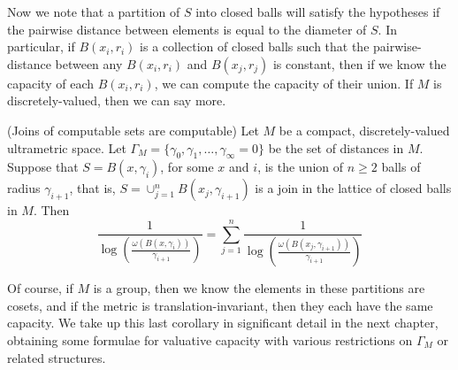 Now we note that a partition of $S$ into closed balls will satisfy the hypotheses if the pairwise distance between elements is equal to the diameter of $S$. In particular, if $B(x_i,r_i)$ is a collection of closed balls such that the pairwise-distance between any $B(x_i,r_i)$ and $B(x_j,r_j)$ is constant, then if we know the capacity of each $B(x_i,r_i)$, we can compute the capacity of their union. If $M$ is discretely-valued, then we can say more.\\ 
\begin{corollary}
	(Joins of computable sets are computable) Let $M$ be a compact, discretely-valued ultrametric space. Let $\Gamma_M = \{\gamma_0, \gamma_1,\ldots, \gamma_\infty=0\}$ be the set of distances in $M$. Suppose that $S = B(x, \gamma_i)$,  for some $x$ and $i$, is the union of $n \geq 2$ balls of radius $\gamma_{i+1}$, that is, $S=\cup_{j=1}^n B(x_j, \gamma_{i+1})$ is a join in the lattice of closed balls in $M$. Then 
	\[\frac{1}{\log(\frac{\omega(B(x, \gamma_i))}{\gamma_{i+1}} )} = \sum_{j=1}^n \frac{1}{\log(\frac{\omega(B(x_j, \gamma_{i+1}))}{\gamma_{i+1} })}\]
\end{corollary}

Of course, if $M$ is a group, then we know the elements in these partitions are cosets, and if the metric is translation-invariant, then they each have the same capacity. We take up this last corollary in significant detail in the next chapter, obtaining some formulae for valuative capacity with various restrictions on $\Gamma_M$ or related structures.